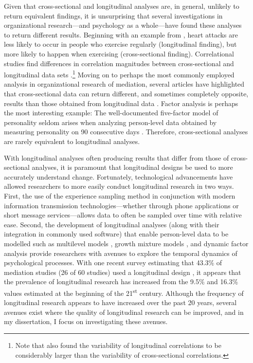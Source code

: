 \documentclass[
12pt, %
twoside,
english]{guelphthesis}
\begin{document}
Given that cross-sectional and longitudinal analyses are, in general, unlikely to return equivalent findings, it is unsurprising that several investigations in organizational research---and psychology as a whole---have found these analyses to return different results. Beginning with an example from \textcite{curran2011}, heart attacks are less likely to occur in people who exercise regularly (longitudinal finding), but more likely to happen when exercising (cross-sectional finding). Correlational studies find differences in correlation magnitudes between cross-sectional and longitudinal data sets \autocites[for a meta-analytic review, see][]{nixon2011,fisher2018}.\footnote{Note that \textcite{fisher2018} also found the variability of longitudinal correlations to be considerably larger than the variability of cross-sectional correlations.} Moving on to perhaps the most commonly employed analysis in organizational research of mediation, several articles have highlighted that cross-sectional data can return different, and sometimes completely opposite, results than those obtained from longitudinal data \autocite{cole2003,maxwell2007,maxwell2011,olaughlin2018}. Factor analysis is perhaps the most interesting example: The well-documented five-factor model of personality seldom arises when analyzing person-level data obtained by measuring personality on 90 consecutive days \autocite{hamaker2005}. Therefore, cross-sectional analyses are rarely equivalent to longitudinal analyses.

With longitudinal analyses often producing results that differ from those of cross-sectional analyses, it is paramount that longitudinal designs be used to more accurately understand change. Fortunately, technological advancements have allowed researchers to more easily conduct longitudinal research in two ways. First, the use of the experience sampling method \autocite{beal2015} in conjunction with modern information transmission technologies---whether through phone applications or short message services---allows data to often be sampled over time with relative ease. Second, the development of longitudinal analyses (along with their integration in commonly used software) that enable person-level data to be modelled such as multilevel models \autocite{raudenbush2002}, growth mixture models \autocite{wang2007}, and dynamic factor analysis \autocite{ram2013} provide researchers with avenues to explore the temporal dynamics of psychological processes. With one recent survey estimating that 43.3\% of mediation studies (26 of 60 studies) used a longitudinal design \autocite{olaughlin2018}, it appears that the prevalence of longitudinal research has increased from the 9.5\% \autocite{roe2008} and 16.3\% \autocite{mitchell2013} values estimated at the beginning of the 21\textsuperscript{st} century. Although the frequency of longitudinal research appears to have increased over the past 20 years, several avenues exist where the quality of longitudinal research can be improved, and in my dissertation, I focus on investigating these avenues.
\end{document}
